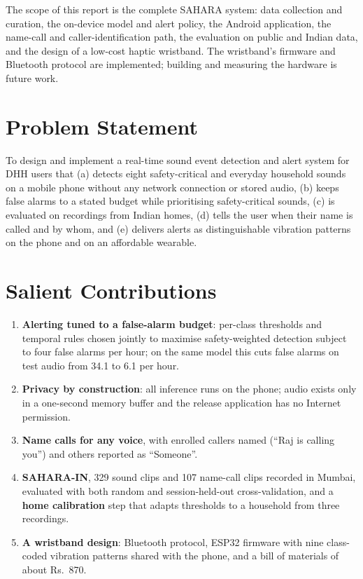 \documentclass[12pt,a4paper,oneside]{report}
\begin{document}
The scope of this report is the complete SAHARA system: data collection and curation, the on-device model and alert policy, the Android application, the name-call and caller-identification path, the evaluation on public and Indian data, and the design of a low-cost haptic wristband. The wristband's firmware and Bluetooth protocol are implemented; building and measuring the hardware is future work.

\section{Problem Statement}
To design and implement a real-time sound event detection and alert system for DHH users that (a) detects eight safety-critical and everyday household sounds on a mobile phone without any network connection or stored audio, (b) keeps false alarms to a stated budget while prioritising safety-critical sounds, (c) is evaluated on recordings from Indian homes, (d) tells the user when their name is called and by whom, and (e) delivers alerts as distinguishable vibration patterns on the phone and on an affordable wearable.

\section{Salient Contributions}
\begin{enumerate}[itemsep=2pt]
\item \textbf{Alerting tuned to a false-alarm budget}: per-class thresholds and temporal rules chosen jointly to maximise safety-weighted detection subject to four false alarms per hour; on the same model this cuts false alarms on test audio from 34.1 to 6.1 per hour.
\item \textbf{Privacy by construction}: all inference runs on the phone; audio exists only in a one-second memory buffer and the release application has no Internet permission.
\item \textbf{Name calls for any voice}, with enrolled callers named (``Raj is calling you'') and others reported as ``Someone''.
\item \textbf{SAHARA-IN}, 329 sound clips and 107 name-call clips recorded in Mumbai, evaluated with both random and session-held-out cross-validation, and a \textbf{home calibration} step that adapts thresholds to a household from three recordings.
\item \textbf{A wristband design}: Bluetooth protocol, ESP32 firmware with nine class-coded vibration patterns shared with the phone, and a bill of materials of about Rs.~870.
\end{enumerate}
\end{document}
